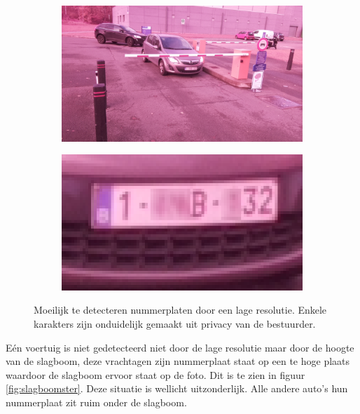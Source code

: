 \begin{figure}[h!]
	\centering
	\begin{subfigure}[b]{0.49\linewidth}
		\includegraphics[width=\linewidth]{img/sterachter/sterachter1.jpg}
	\end{subfigure}
	\begin{subfigure}[b]{0.49\linewidth}
		\includegraphics[width=\linewidth]{img/sterachter/sterachter2.png}
	\end{subfigure}
	\caption{Moeilijk te detecteren nummerplaten door een lage resolutie. Enkele karakters zijn onduidelijk gemaakt uit privacy van de bestuurder.}
	\label{fig:lowressterre}
\end{figure}

Eén voertuig is niet gedetecteerd niet door de lage resolutie maar door de hoogte van de slagboom, deze vrachtagen zijn nummerplaat staat op een te hoge plaats waardoor de slagboom ervoor staat op de foto. Dit is te zien in figuur \ref{fig:slagboomster}. Deze situatie is wellicht uitzonderlijk. Alle andere auto's hun nummerplaat zit ruim onder de slagboom.

